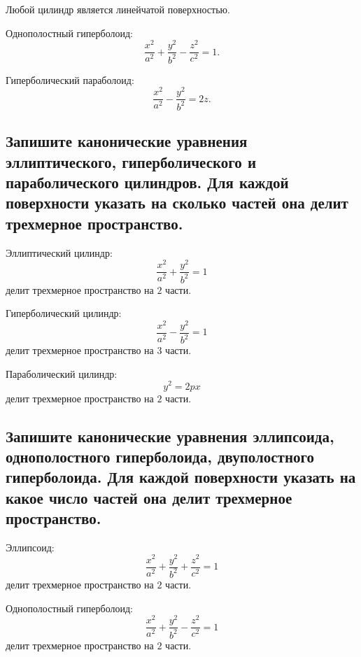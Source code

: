 \begin{remark}
    Любой цилиндр является линейчатой поверхностью.
\end{remark}

\begin{example}
    Однополостный гиперболоид:
    \[
        \frac{x^2}{a^2}+\frac{y^2}{b^2}-\frac{z^2}{c^2}=1.
    \]
\end{example}

\begin{example}
    Гиперболический параболоид:
    \[
        \frac{x^2}{a^2}-\frac{y^2}{b^2}=2z.
    \]
\end{example}
\subsection{Запишите канонические уравнения эллиптического, гиперболического и параболического цилиндров. Для каждой поверхности указать на сколько частей она делит трехмерное пространство.}

\begin{remark}
    Эллиптический цилиндр:
    \[
        \frac{x^2}{a^2}+\frac{y^2}{b^2}=1
    \]
    делит трехмерное пространство на $2$ части.
\end{remark}

\begin{remark}
    Гиперболический цилиндр:
    \[
        \frac{x^2}{a^2}-\frac{y^2}{b^2}=1
    \]
    делит трехмерное пространство на $3$ части.
\end{remark}

\begin{remark}
    Параболический цилиндр:
    \[
        y^2=2px
    \]
    делит трехмерное пространство на $2$ части.
\end{remark}


\subsection{Запишите канонические уравнения эллипсоида, однополостного гиперболоида, двуполостного гиперболоида. Для каждой поверхности указать на какое число частей она делит трехмерное пространство.}

\begin{remark}
    Эллипсоид:
    \[
        \frac{x^2}{a^2}+\frac{y^2}{b^2}+\frac{z^2}{c^2}=1
    \]
    делит трехмерное пространство на $2$ части.
\end{remark}

\begin{remark}
    Однополостный гиперболоид:
    \[
        \frac{x^2}{a^2}+\frac{y^2}{b^2}-\frac{z^2}{c^2}=1
    \]
    делит трехмерное пространство на $2$ части.
\end{remark}

